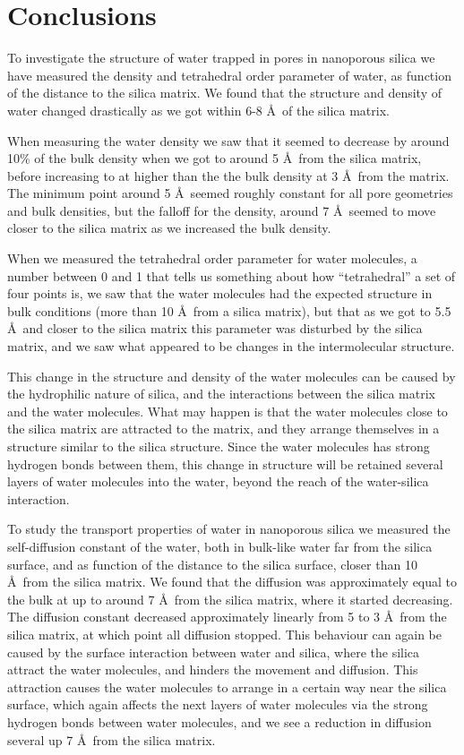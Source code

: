 \section{Conclusions}
To investigate the structure of water trapped in pores in nanoporous silica we have measured the density and tetrahedral order parameter of water, as function of the distance to the silica matrix. We found that the structure and density of water changed drastically as we got within 6-8 \AA\ of the silica matrix.

When measuring the water density we saw that it seemed to decrease by around 10\% of the bulk density when we got to around 5 \AA\ from the silica matrix, before increasing to at higher than the the bulk density at 3 \AA\ from the matrix. The minimum point around 5 \AA\ seemed roughly constant for all pore geometries and bulk densities, but the falloff for the density, around 7 \AA\ seemed to move closer to the silica matrix as we increased the bulk density.

When we measured the tetrahedral order parameter for water molecules, a number between 0 and 1 that tells us something about how ``tetrahedral'' a set of four points is, we saw that the water molecules had the expected structure in bulk conditions (more than 10 \AA\ from a silica matrix), but that as we got to 5.5 \AA\ and closer to the silica matrix this parameter was disturbed by the silica matrix, and we saw what appeared to be changes in the intermolecular structure.

This change in the structure and density of the water molecules can be caused by the hydrophilic nature of silica, and the interactions between the silica matrix and the water molecules. What may happen is that the water molecules close to the silica matrix are attracted to the matrix, and they arrange themselves in a structure similar to the silica structure. Since the water molecules has strong hydrogen bonds between them, this change in structure will be retained several layers of water molecules into the water, beyond the reach of the water-silica interaction.

To study the transport properties of water in nanoporous silica we measured the self-diffusion constant of the water, both in bulk-like water far from the silica surface, and as function of the distance to the silica surface, closer than 10 \AA\ from the silica matrix. We found that the diffusion was approximately equal to the bulk at up to around 7 \AA\ from the silica matrix, where it started decreasing. The diffusion constant decreased approximately linearly from 5 to 3 \AA\ from the silica matrix, at which point all diffusion stopped. This behaviour can again be caused by the surface interaction between water and silica, where the silica attract the water molecules, and hinders the movement and diffusion. This attraction causes the water molecules to arrange in a certain way near the silica surface, which again affects the next layers of water molecules via the strong hydrogen bonds between water molecules, and we see a reduction in diffusion several up 7 \AA\ from the silica matrix.

